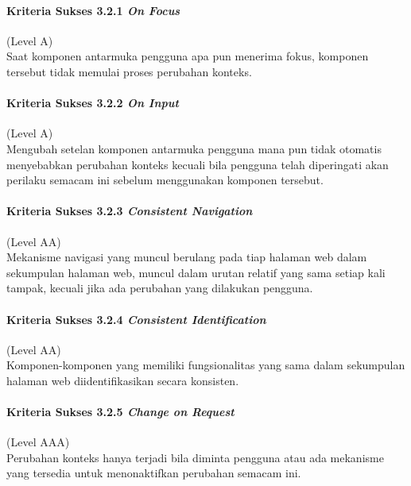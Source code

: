 \paragraph{Kriteria Sukses 3.2.1 \textit{On Focus}}
\label{sec:kriteria_sukses_3.2.1}
(Level A)\\

Saat komponen antarmuka pengguna apa pun menerima fokus, komponen tersebut tidak memulai proses perubahan konteks.

\paragraph{Kriteria Sukses 3.2.2 \textit{On Input}}
\label{sec:kriteria_sukses_3.2.2}
(Level A)\\

Mengubah setelan komponen antarmuka pengguna mana pun tidak otomatis menyebabkan perubahan konteks kecuali bila pengguna telah diperingati akan perilaku semacam ini sebelum menggunakan komponen tersebut.

\paragraph{Kriteria Sukses 3.2.3 \textit{Consistent Navigation}}
\label{sec:kriteria_sukses_3.2.3}
(Level AA)\\

Mekanisme navigasi yang muncul berulang pada tiap halaman web dalam sekumpulan halaman web, muncul dalam urutan relatif yang sama setiap kali tampak, kecuali jika ada perubahan yang dilakukan pengguna.

\paragraph{Kriteria Sukses 3.2.4 \textit{Consistent Identification}}
\label{sec:kriteria_sukses_3.2.4}
(Level AA)\\

Komponen-komponen yang memiliki fungsionalitas yang sama dalam sekumpulan halaman web diidentifikasikan secara konsisten.

\paragraph{Kriteria Sukses 3.2.5 \textit{Change on Request}}
\label{sec:kriteria_sukses_3.2.5}
(Level AAA)\\

Perubahan konteks hanya terjadi bila diminta pengguna atau ada mekanisme yang tersedia untuk menonaktifkan perubahan semacam ini.

